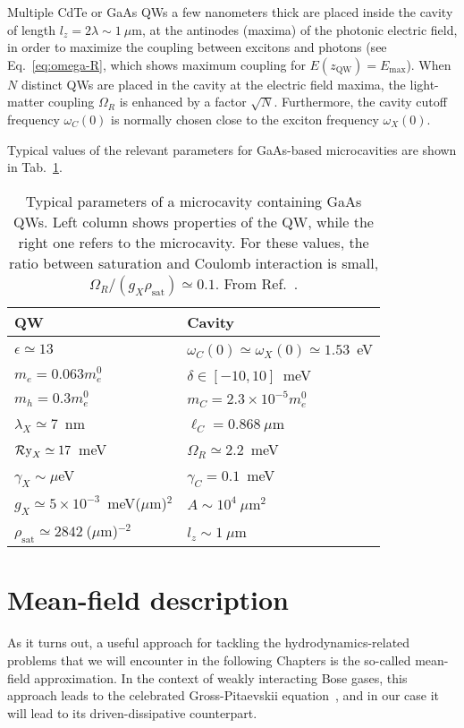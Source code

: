 Multiple CdTe or GaAs QWs a few nanometers thick are placed inside the
cavity of length $l_z = 2\lambda \sim 1~\mu$m, at the antinodes
(maxima) of the photonic electric field, in order to maximize the
coupling between excitons and photons (see Eq.~\eqref{eq:omega-R},
which shows maximum coupling for $E(z_{\text{QW}}) =
E_{\text{max}}$). When $N$ distinct QWs are placed in the cavity at
the electric field maxima, the light-matter coupling $\Omega_R$ is
enhanced by a factor $\sqrt{N}$. Furthermore, the cavity cutoff
frequency $\omega_C(0)$ is normally chosen close to the exciton
frequency $\omega_X(0)$.

Typical values of the relevant parameters for GaAs-based
microcavities are shown in Tab.~\ref{tab:GaAs-params}. 
%
\begin{table}
  \centering
  \begin{tabular}{@{}ll@{}} \toprule
    QW & Cavity \\ \midrule
    $\epsilon \simeq 13$ &  $\omega_C(0) \simeq \omega_X(0) \simeq 1.53$~eV\\
    $m_e = 0.063m^0_e$    &  $\delta \in [-10,10]$~meV\\
    $m_h = 0.3m^0_e$      &  $m_{C} = 2.3\times 10^{-5} m^0_e$ \\
    $\lambda_X \simeq 7$~nm   & $\ell_{C} = 0.868~\mu$m\\
    $\operatorname{\mathcal{R}y}_X \simeq 17$~meV &  $\Omega_R \simeq 2.2$~meV \\
    $\gamma_X \sim \mu$eV &  $\gamma_C = 0.1$~meV \\ 
    $g_X \simeq 5\times10^{-3}$~meV($\mu$m)$^2$ &  $A \sim 10^4~\mu$m$^2$\\
    $\rho_{\text{sat}} \simeq 2842~$($\mu$m)$^{-2}$ &  $l_z \sim 1~\mu$m\\ \bottomrule
  \end{tabular}
  \caption{Typical parameters of a microcavity containing GaAs QWs. Left column shows properties of the QW, while the right one refers to the microcavity. For these values, the ratio between saturation and
    Coulomb interaction is small,
    $\Omega_R/(g_X \rho_{\text{sat}}) \simeq 0.1$. From Ref.~\cite{9783642241857}.}
  \label{tab:GaAs-params}
\end{table}
%


\section{Mean-field description}
\label{sec:mean-field}

As it turns out, a useful approach for tackling the
hydrodynamics-related problems that we will encounter in the following
Chapters is the so-called mean-field approximation. In the context of
weakly interacting Bose gases, this approach leads to the celebrated
Gross-Pitaevskii equation~\cite{9780198507192}, and in our case it
will lead to its driven-dissipative counterpart.

